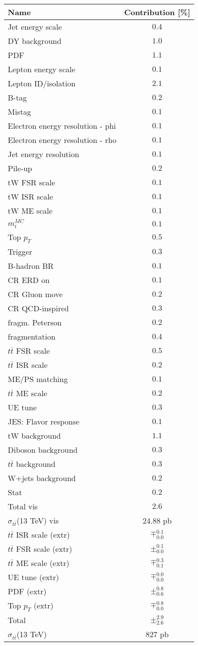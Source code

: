 \begin{tabular}{ l |  c }
 \hline
Name & Contribution [\%] \\ \hline
Jet energy scale & ${0.4}$ \\
DY background & ${1.0}$ \\
PDF & ${1.1}$ \\
Lepton energy scale & ${0.1}$ \\
Lepton ID/isolation & ${2.1}$ \\
B-tag & ${0.2}$ \\
Mistag & ${0.1}$ \\
Electron energy resolution - phi & ${0.1}$ \\
Electron energy resolution - rho & ${0.1}$ \\
Jet energy resolution & ${0.1}$ \\
Pile-up & ${0.2}$ \\
tW FSR scale & ${0.1}$ \\
tW ISR scale & ${0.1}$ \\
tW ME scale & ${0.1}$ \\
$m_{t}^{MC}$ & ${0.1}$ \\
Top $p_{T}$ & ${0.5}$ \\
Trigger & ${0.3}$ \\
B-hadron BR & ${0.1}$ \\
CR ERD on & ${0.1}$ \\
CR Gluon move & ${0.2}$ \\
CR QCD-inspired & ${0.3}$ \\
fragm. Peterson & ${0.2}$ \\
fragmentation & ${0.4}$ \\
$t\bar{t}$ FSR scale & ${0.5}$ \\
$t\bar{t}$ ISR scale & ${0.2}$ \\
ME/PS matching & ${0.1}$ \\
$t\bar{t}$ ME scale & ${0.2}$ \\
UE tune & ${0.3}$ \\
JES: Flavor response & ${0.1}$ \\
tW background & ${1.1}$ \\
Diboson background & ${0.3}$ \\
$t\bar{t}$ background & ${0.3}$ \\
W+jets background & ${0.2}$ \\
Stat & ${0.2}$ \\
Total vis & ${2.6}$ \\ \hline
$\sigma_{t\bar{t}}$(13 TeV) vis & 24.88 pb \\ \hline
$t\bar{t}$ ISR scale (extr) & $\mp^{0.1}_{0.0}$ \\
$t\bar{t}$ FSR scale (extr) & $\pm^{0.1}_{0.0}$ \\
$t\bar{t}$ ME scale (extr) & $\mp^{0.3}_{0.1}$ \\
UE tune (extr) & $\mp^{0.0}_{0.0}$ \\
PDF (extr) & $\pm^{0.8}_{0.6}$ \\
Top $p_{T}$ (extr) & $\mp^{0.8}_{0.0}$ \\ \hline
Total & $\pm^{2.9}_{2.6}$ \\ \hline
$\sigma_{t\bar{t}}$(13 TeV) & 827 pb \\ \hline \hline
\end{tabular}
